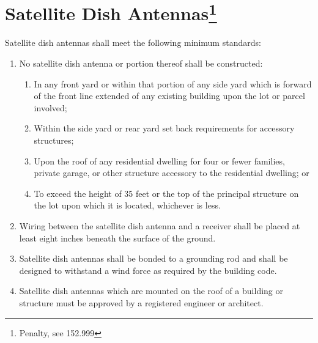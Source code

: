 \section{Satellite Dish Antennas\footnote{Penalty, see 152.999}}
Satellite dish antennas shall meet the following minimum standards:
\begin{enumerate}[{\indent}A)]
    \item No satellite dish antenna or portion thereof shall be constructed:
        \begin{enumerate}
            \item In any front yard or within that portion of any side yard which is forward of the front line extended of any existing building upon the lot or parcel involved;
            \item Within the side yard or rear yard set back requirements for accessory structures; 
            \item Upon the roof of any residential dwelling for four or fewer families, private garage, or other structure accessory to the residential dwelling; or 
            \item To exceed the height of 35 feet or the top of the principal structure on the lot upon which it is located, whichever is less.
        \end{enumerate}
    \item Wiring between the satellite dish antenna and a receiver shall be placed at least eight inches beneath the surface of the ground.
    \item Satellite dish antennas shall be bonded to a grounding rod and shall be designed to withstand a wind force as required by the building code.
    \item Satellite dish antennas which are mounted on the roof of a building or structure must be approved by a registered engineer or architect.
\end{enumerate}

